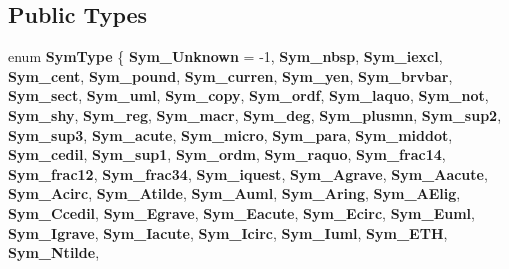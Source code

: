 \subsection*{Public Types}
\begin{DoxyCompactItemize}
\item 
\mbox{\label{class_doc_symbol_abea9ba345564542cc6b65ae4c76be6c2}} 
enum {\bfseries Sym\+Type} \{ \newline
{\bfseries Sym\+\_\+\+Unknown} = -\/1, 
{\bfseries Sym\+\_\+nbsp}, 
{\bfseries Sym\+\_\+iexcl}, 
{\bfseries Sym\+\_\+cent}, 
\newline
{\bfseries Sym\+\_\+pound}, 
{\bfseries Sym\+\_\+curren}, 
{\bfseries Sym\+\_\+yen}, 
{\bfseries Sym\+\_\+brvbar}, 
\newline
{\bfseries Sym\+\_\+sect}, 
{\bfseries Sym\+\_\+uml}, 
{\bfseries Sym\+\_\+copy}, 
{\bfseries Sym\+\_\+ordf}, 
\newline
{\bfseries Sym\+\_\+laquo}, 
{\bfseries Sym\+\_\+not}, 
{\bfseries Sym\+\_\+shy}, 
{\bfseries Sym\+\_\+reg}, 
\newline
{\bfseries Sym\+\_\+macr}, 
{\bfseries Sym\+\_\+deg}, 
{\bfseries Sym\+\_\+plusmn}, 
{\bfseries Sym\+\_\+sup2}, 
\newline
{\bfseries Sym\+\_\+sup3}, 
{\bfseries Sym\+\_\+acute}, 
{\bfseries Sym\+\_\+micro}, 
{\bfseries Sym\+\_\+para}, 
\newline
{\bfseries Sym\+\_\+middot}, 
{\bfseries Sym\+\_\+cedil}, 
{\bfseries Sym\+\_\+sup1}, 
{\bfseries Sym\+\_\+ordm}, 
\newline
{\bfseries Sym\+\_\+raquo}, 
{\bfseries Sym\+\_\+frac14}, 
{\bfseries Sym\+\_\+frac12}, 
{\bfseries Sym\+\_\+frac34}, 
\newline
{\bfseries Sym\+\_\+iquest}, 
{\bfseries Sym\+\_\+\+Agrave}, 
{\bfseries Sym\+\_\+\+Aacute}, 
{\bfseries Sym\+\_\+\+Acirc}, 
\newline
{\bfseries Sym\+\_\+\+Atilde}, 
{\bfseries Sym\+\_\+\+Auml}, 
{\bfseries Sym\+\_\+\+Aring}, 
{\bfseries Sym\+\_\+\+A\+Elig}, 
\newline
{\bfseries Sym\+\_\+\+Ccedil}, 
{\bfseries Sym\+\_\+\+Egrave}, 
{\bfseries Sym\+\_\+\+Eacute}, 
{\bfseries Sym\+\_\+\+Ecirc}, 
\newline
{\bfseries Sym\+\_\+\+Euml}, 
{\bfseries Sym\+\_\+\+Igrave}, 
{\bfseries Sym\+\_\+\+Iacute}, 
{\bfseries Sym\+\_\+\+Icirc}, 
\newline
{\bfseries Sym\+\_\+\+Iuml}, 
{\bfseries Sym\+\_\+\+E\+TH}, 
{\bfseries Sym\+\_\+\+Ntilde}, 

\end{DoxyCompactItemize}
